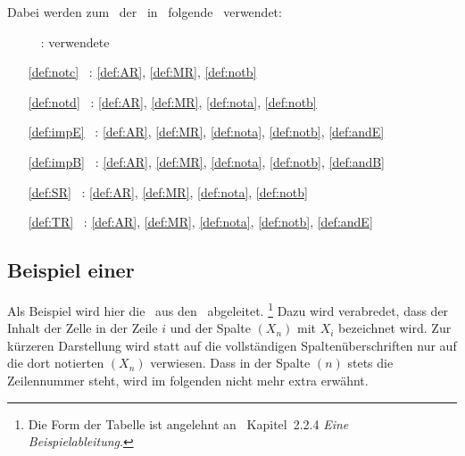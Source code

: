 Dabei werden zum \Beweis\ der \Schlussregeln\ in~\cite{bib:Rautenberg} folgende \Basisregeln\ verwendet:
\begin{itemize}
	\renewcommand*{\itemindent}{3cm}
	\renewcommand*{\labelsep}{5pt}
	\item[\Schlussregel\ ~:] verwendete \Basisregeln
	\item[\ref{def:notc} ~:] \ref{def:AR}, \ref{def:MR}, \ref{def:notb}
	\item[\ref{def:notd} ~:] \ref{def:AR}, \ref{def:MR}, \ref{def:nota}, \ref{def:notb}
	\item[\ref{def:impE} ~:] \ref{def:AR}, \ref{def:MR}, \ref{def:nota}, \ref{def:notb}, \ref{def:andE}
	\item[\ref{def:impB} ~:] \ref{def:AR}, \ref{def:MR}, \ref{def:nota}, \ref{def:notb}, \ref{def:andB}
	\item[\ref{def:SR}   ~:] \ref{def:AR}, \ref{def:MR}, \ref{def:nota}, \ref{def:notb}
	\item[\ref{def:TR}   ~:] \ref{def:AR}, \ref{def:MR}, \ref{def:nota}, \ref{def:notb}, \ref{def:andE}
\end{itemize}
%
\subsection[Beispiel einer Ableitung]{Beispiel einer \Ableitung}%
\label                           {sub:BeispielAbleitung}

Als Beispiel wird hier die \Schnittregel\ aus den \Basisregeln\ abgeleitet.%
\footnote{%
	Die Form der Tabelle ist angelehnt an~\cite{bib:NatuerlichesSchliessen} Kapitel~2.2.4 \emph{Eine Beispielableitung}.
}
Dazu wird verabredet, dass  der Inhalt der Zelle in der Zeile $i$ und der Spalte $(X_n)$ mit $X_i$ bezeichnet wird.
Zur kürzeren Darstellung wird statt auf die vollständigen Spaltenüberschriften nur auf die dort notierten $(X_n)$ verwiesen. Dass in der Spalte $(n)$ stets die Zeilennummer steht, wird im folgenden nicht mehr extra erwähnt.

